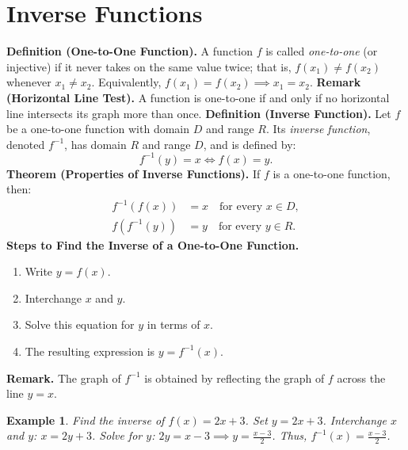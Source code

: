 \documentclass[11pt,a4paper]{article}
\newtheorem{example}{Example}
\begin{document}
\section{Inverse Functions}
\textbf{Definition (One-to-One Function).} A function $f$ is called \textit{one-to-one} (or injective) if it never takes on the same value twice; that is, $f(x_1) \neq f(x_2)$ whenever $x_1 \neq x_2$. Equivalently, $f(x_1) = f(x_2) \implies x_1 = x_2$.
\textbf{Remark (Horizontal Line Test).} A function is one-to-one if and only if no horizontal line intersects its graph more than once.
\textbf{Definition (Inverse Function).} Let $f$ be a one-to-one function with domain $D$ and range $R$. Its \textit{inverse function}, denoted $f^{-1}$, has domain $R$ and range $D$, and is defined by:
\begin{equation*}
f^{-1}(y) = x \iff f(x) = y.
\end{equation*}
\textbf{Theorem (Properties of Inverse Functions).} If $f$ is a one-to-one function, then:
\begin{align*}
f^{-1}(f(x)) &= x \quad \text{for every } x \in D, \\
f(f^{-1}(y)) &= y \quad \text{for every } y \in R.
\end{align*}
\textbf{Steps to Find the Inverse of a One-to-One Function.}
\begin{enumerate}
\item Write $y = f(x)$.
\item Interchange $x$ and $y$.
\item Solve this equation for $y$ in terms of $x$.
\item The resulting expression is $y = f^{-1}(x)$.
\end{enumerate}
\textbf{Remark.} The graph of $f^{-1}$ is obtained by reflecting the graph of $f$ across the line $y = x$.
\begin{example}
Find the inverse of $f(x) = 2x + 3$.
Set $y = 2x + 3$. Interchange $x$ and $y$: $x = 2y + 3$. Solve for $y$: $2y = x - 3 \implies y = \frac{x-3}{2}$. Thus, $f^{-1}(x) = \frac{x-3}{2}$.
\end{example}
\end{document}
